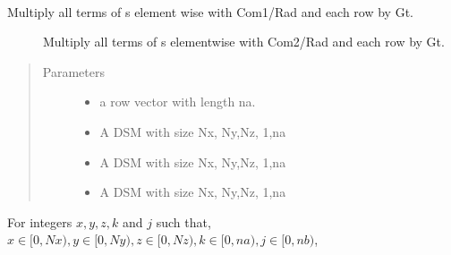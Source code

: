 \documentclass[letterpaper,10pt,english]{sphinxmanual}
\begin{document}
\begin{fulllineitems}
\begin{fulllineitems}
\begin{quote}
\begin{description}
\end{description}\end{quote}

\end{fulllineitems}


\begin{fulllineitems}
\label{\detokenize{index:DictionarySparseMatrix.DS.gain_phase_rad_ref_mul}}~\begin{description}
\item[{Multiply all terms of s element wise with Com1/Rad and each row by Gt.}] \leavevmode
Multiply all terms of s elementwise with Com2/Rad and each row by Gt.

\end{description}
\begin{quote}\begin{description}
\item[{Parameters}] \leavevmode\begin{itemize}
\item {} 
 \textendash{} a row vector with length na.

\item {} 
 \textendash{} A DSM with size Nx, Ny,Nz, 1,na

\item {} 
 \textendash{} A DSM with size Nx, Ny,Nz, 1,na

\item {} 
 \textendash{} A DSM with size Nx, Ny,Nz, 1,na

\end{itemize}

\end{description}\end{quote}

For integers \(x,y,z,k\) and \(j\) such that,
\(x \in [0,Nx), y \in [0,Ny), z \in [0,Nz), k \in [0,na),j \in [0,nb)\),


\end{fulllineitems}
\end{fulllineitems}
\end{document}
